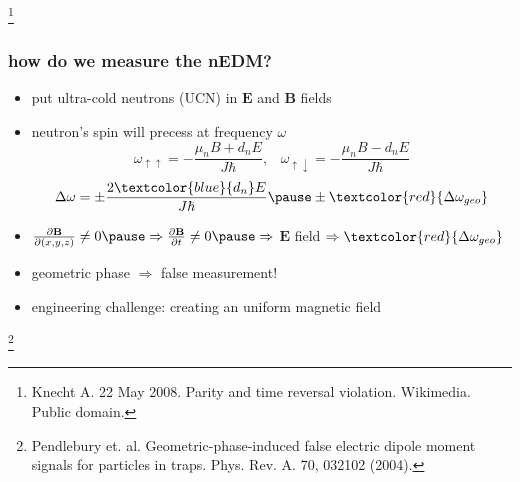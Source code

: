 \documentclass{beamer}
\renewcommand{\vec}{\mathbf}
\newcommand{\bottomcite}{\let\thefootnote\relax\footnote}
\begin{document}
\begin{frame}
\begin{columns}
    \end{columns}
    
    \bottomcite{Knecht A. 22 May 2008. Parity and time reversal violation. Wikimedia. Public domain.}

\end{frame}

\begin{frame}
\frametitle{how do we measure the nEDM?}

    \begin{itemize}
        \item put ultra-cold neutrons (UCN) in $\vec{E}$ and $\vec{B}$ fields \pause
        \item neutron's spin will precess at frequency $\omega$
        \begin{equation}
        \omega_{\uparrow\uparrow} = -\frac{\mu_n B + d_n E}{J\hbar}, \;\;\;
        \omega_{\uparrow\downarrow} = -\frac{\mu_n B - d_n E}{J\hbar}
        \end{equation} \pause
        \begin{equation}
        \Delta\omega = \pm\frac{2 \textcolor{blue}{d_n} E}{J\hbar} \pause \pm 
        \textcolor{red}{\Delta\omega_{geo}}
        \end{equation} \pause
        \item $\frac{\partial \vec{B}}{\partial (x,y,z)} \neq 0 \pause \Rightarrow
        \frac{\partial \vec{B}}{\partial t} \neq 0 \pause \Rightarrow$ $\vec{E}$ field
        \pause
        $\Rightarrow \textcolor{red}{\Delta\omega_{geo}}$ \pause
        \bigskip
        \item geometric phase $\Rightarrow$ false measurement! \pause
        \item engineering challenge: creating an uniform magnetic field
    \end{itemize}

    \bottomcite{Pendlebury et. al. Geometric-phase-induced false electric dipole moment signals
    for particles in traps. Phys. Rev. A. 70, 032102 (2004).}

\end{frame}
\end{document}
